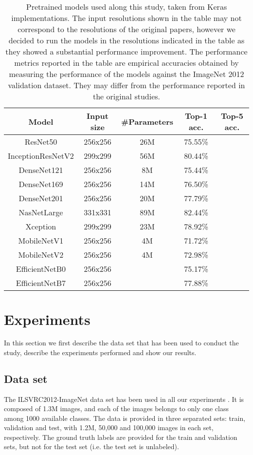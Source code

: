 \documentclass{elsarticle}
\begin{document}
	
	\begin{table}[h]
		\small
		\caption{Pretrained models used along this study, taken from Keras implementations. The input resolutions shown in the table may not correspond to the resolutions of the original papers, however we decided to run the models in the resolutions indicated in the table as they showed a substantial performance improvement. The performance metrics reported in the table are empirical accuracies obtained by measuring the performance of the models against the ImageNet 2012 validation dataset. They may differ from the performance reported in the original studies.}
		\centering
	\begin{tabular}{c|cc|cc}
		\toprule
		Model & Input size & \#Parameters & Top-1 acc. & Top-5 acc. \\
		\midrule
		ResNet50 & 256x256 & 26M & 75.55\% &  \\
		InceptionResNetV2 & 299x299 & 56M & 80.44\% &  \\
		DenseNet121 & 256x256 & 8M & 75.44\% &  \\
		DenseNet169 & 256x256 & 14M & 76.50\% &  \\
		DenseNet201 & 256x256 & 20M & 77.79\% &  \\
		NasNetLarge & 331x331 & 89M & 82.44\% &  \\
		Xception & 299x299 & 23M & 78.92\% &  \\
		MobileNetV1 & 256x256 & 4M & 71.72\% &  \\
		MobileNetV2 & 256x256 & 4M & 72.98\% &  \\
		EfficientNetB0 & 256x256 &  & 75.17\% &  \\
		EfficientNetB7 & 256x256 &  & 77.88\% &  \\
		\bottomrule
	\end{tabular}
	\label{table:models}
	\end{table}
	
	\section{Experiments}
	In this section we first describe the data set that has been used to conduct the study, describe the experiments performed and show our results.
	\subsection{Data set}
	The ILSVRC2012-ImageNet data set has been used in all our experiments \cite{ILSVRC15}. It is composed of 1.3M images, and each of the images belongs to only one class among 1000 available classes. The data is provided in three separated sets: train, validation and test, with 1.2M, 50,000 and 100,000 images in each set, respectively. The ground truth labels are provided for the train and validation sets, but not for the test set (i.e. the test set is unlabeled).
	
\end{document}
